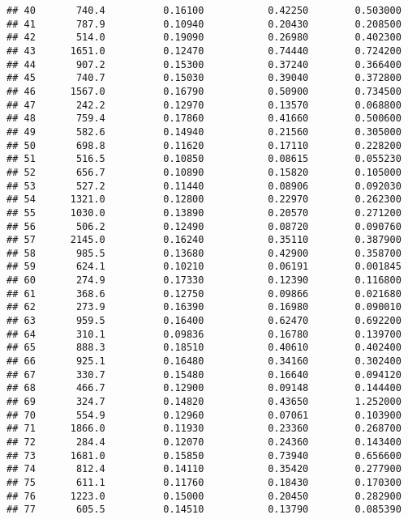 \documentclass[
]{article}
\begin{document}
\begin{verbatim}
## 40       740.4          0.16100           0.42250        0.503000
## 41       787.9          0.10940           0.20430        0.208500
## 42       514.0          0.19090           0.26980        0.402300
## 43      1651.0          0.12470           0.74440        0.724200
## 44       907.2          0.15300           0.37240        0.366400
## 45       740.7          0.15030           0.39040        0.372800
## 46      1567.0          0.16790           0.50900        0.734500
## 47       242.2          0.12970           0.13570        0.068800
## 48       759.4          0.17860           0.41660        0.500600
## 49       582.6          0.14940           0.21560        0.305000
## 50       698.8          0.11620           0.17110        0.228200
## 51       516.5          0.10850           0.08615        0.055230
## 52       656.7          0.10890           0.15820        0.105000
## 53       527.2          0.11440           0.08906        0.092030
## 54      1321.0          0.12800           0.22970        0.262300
## 55      1030.0          0.13890           0.20570        0.271200
## 56       506.2          0.12490           0.08720        0.090760
## 57      2145.0          0.16240           0.35110        0.387900
## 58       985.5          0.13680           0.42900        0.358700
## 59       624.1          0.10210           0.06191        0.001845
## 60       274.9          0.17330           0.12390        0.116800
## 61       368.6          0.12750           0.09866        0.021680
## 62       273.9          0.16390           0.16980        0.090010
## 63       959.5          0.16400           0.62470        0.692200
## 64       310.1          0.09836           0.16780        0.139700
## 65       888.3          0.18510           0.40610        0.402400
## 66       925.1          0.16480           0.34160        0.302400
## 67       330.7          0.15480           0.16640        0.094120
## 68       466.7          0.12900           0.09148        0.144400
## 69       324.7          0.14820           0.43650        1.252000
## 70       554.9          0.12960           0.07061        0.103900
## 71      1866.0          0.11930           0.23360        0.268700
## 72       284.4          0.12070           0.24360        0.143400
## 73      1681.0          0.15850           0.73940        0.656600
## 74       812.4          0.14110           0.35420        0.277900
## 75       611.1          0.11760           0.18430        0.170300
## 76      1223.0          0.15000           0.20450        0.282900
## 77       605.5          0.14510           0.13790        0.085390

\end{verbatim}
\end{document}
